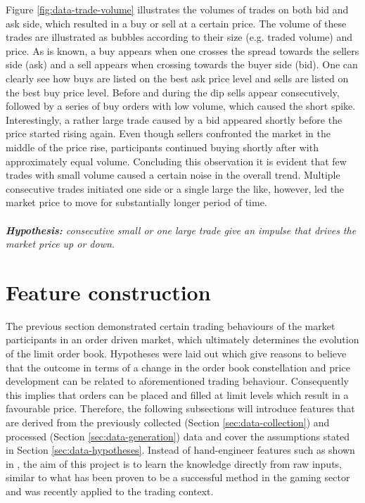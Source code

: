 Figure \ref{fig:data-trade-volume} illustrates the volumes of trades on both bid and ask side, which resulted in a buy or sell at a certain price.
The volume of these trades are illustrated as bubbles according to their size (e.g. traded volume) and price.
As is known, a buy appears when one crosses the spread towards the sellers side (ask) and a sell appears when crossing towards the buyer side (bid).
One can clearly see how buys are listed on the best ask price level and sells are listed on the best buy price level.
Before and during the dip sells appear consecutively, followed by a series of buy orders with low volume, which caused the short spike.
Interestingly, a rather large trade caused by a bid appeared shortly before the price started rising again.
Even though sellers confronted the market in the middle of the price rise, participants continued buying shortly after with approximately equal volume.
Concluding this observation it is evident that few trades with small volume caused a certain noise in the overall trend.
Multiple consecutive trades initiated one side or a single large the like, however, led the market price to move for substantially longer period of time.
\\
\\
\textit{\textbf{Hypothesis:} consecutive small or one large trade give an impulse that drives the market price up or down.}


\section{Feature construction}
\label{sec:feature-engineering}
The previous section demonstrated certain trading behaviours of the market participants in an order driven market, which ultimately determines the evolution of the limit order book. 
Hypotheses were laid out which give reasons to believe that the outcome in terms of a change in the order book constellation and price development can be related to aforementioned trading behaviour.
Consequently this implies that orders can be placed and filled at limit levels which result in a favourable price.
Therefore, the following subsections will introduce features that are derived from the previously collected (Section \ref{sec:data-collection}) and processed (Section \ref{sec:data-generation}) data and cover the assumptions stated in Section \ref{sec:data-hypotheses}.
Instead of hand-engineer features such as shown in \cite{nevmyvaka2006reinforcement, hwangdeep, fletcher2010multiple}, the aim of this project is to learn the knowledge directly from raw inputs, similar to what has been proven to be a successful method in the gaming sector\cite{mnih2013playing} and was recently applied to the trading context\cite{lu2017agent}.

